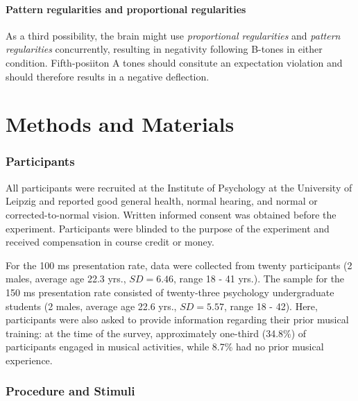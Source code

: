 \documentclass[twoside, man, a4paper,12pt, nofontenc]{apa7}
\begin{document}
\hypertarget{pattern-regularities-and-proportional-regularities}{%
\paragraph{Pattern regularities and proportional
regularities}\label{pattern-regularities-and-proportional-regularities}}

As a third possibility, the brain might use \emph{proportional
regularities} and \emph{pattern regularities} concurrently, resulting in
negativity following B-tones in either condition. Fifth-posiiton A tones
should consitute an expectation violation and should therefore results
in a negative deflection.

\newpage

\hypertarget{methods-and-materials}{%
\section{Methods and Materials}\label{methods-and-materials}}

\hypertarget{participants}{%
\subsubsection{Participants}\label{participants}}

All participants were recruited at the Institute of Psychology at the
University of Leipzig and reported good general health, normal hearing,
and normal or corrected-to-normal vision. Written informed consent was
obtained before the experiment. Participants were blinded to the purpose
of the experiment and received compensation in course credit or money.

For the 100 ms presentation rate, data were collected from twenty
participants (2 males, average age 22.3 yrs., \(SD=6.46\), range 18 - 41
yrs.). The sample for the 150 ms presentation rate consisted of
twenty-three psychology undergraduate students (2 males, average age
22.6 yrs., \(SD=5.57\), range 18 - 42). Here, participants were also
asked to provide information regarding their prior musical training: at
the time of the survey, approximately one-third (34.8\%) of participants
engaged in musical activities, while 8.7\% had no prior musical
experience.

\hypertarget{procedure-and-stimuli}{%
\subsubsection{Procedure and Stimuli}\label{procedure-and-stimuli}}
\end{document}
